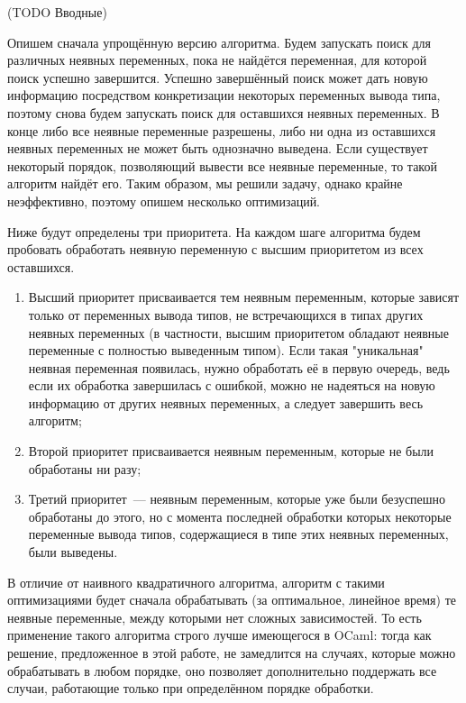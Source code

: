 \documentclass[../diploma.tex]{subfiles}
\begin{document}
(TODO Вводные)

Опишем сначала упрощённую версию алгоритма. Будем запускать поиск для различных неявных переменных, пока не найдётся переменная, для которой поиск успешно завершится. Успешно завершённый поиск может дать новую информацию посредством конкретизации некоторых переменных вывода типа, поэтому снова будем запускать поиск для оставшихся неявных переменных. В конце либо все неявные переменные разрешены, либо ни одна из оставшихся неявных переменных не может быть однозначно выведена. Если существует некоторый порядок, позволяющий вывести все неявные переменные, то такой алгоритм найдёт его. Таким образом, мы решили задачу, однако крайне неэффективно, поэтому опишем несколько оптимизаций.

Ниже будут определены три приоритета. На каждом шаге алгоритма будем пробовать обработать неявную переменную с высшим приоритетом из всех оставшихся.

\begin{enumerate}
\item Высший приоритет присваивается тем неявным переменным, которые зависят только от переменных вывода типов, не встречающихся в типах других неявных переменных (в частности, высшим приоритетом обладают неявные переменные с полностью выведенным типом). Если такая "уникальная" неявная переменная появилась, нужно обработать её в первую очередь, ведь если их обработка завершилась с ошибкой, можно не надеяться на новую информацию от других неявных переменных, а следует завершить весь алгоритм;

\item Второй приоритет присваивается неявным переменным, которые не были обработаны ни разу;

\item Третий приоритет~--- неявным переменным, которые уже были безуспешно обработаны до этого, но с момента последней обработки которых некоторые переменные вывода типов, содержащиеся в типе этих неявных переменных, были выведены.
\end{enumerate}

В отличие от наивного квадратичного алгоритма, алгоритм с такими оптимизациями будет сначала обрабатывать (за оптимальное, линейное время) те неявные переменные, между которыми нет сложных зависимостей. То есть применение такого алгоритма строго лучше имеющегося в OCaml: тогда как решение, предложенное в этой работе, не замедлится на случаях, которые можно обрабатывать в любом порядке, оно позволяет дополнительно поддержать все случаи, работающие только при определённом порядке обработки.
\end{document}
